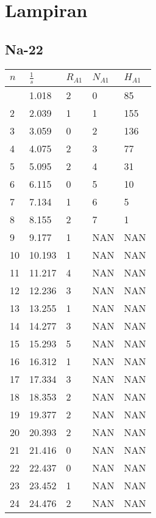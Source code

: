 \documentclass{article}
\begin{document}
	\section*{Lampiran}
		\subsection*{Na-22}
				\begin{longtable}{@{}lllll@{}}
				\toprule
				$n$   & $\frac{1}{s}$     & $R_{A1}$ & $N_{A1}$ & $H_{A1}$ \\* \midrule
				\endfirsthead
				\endhead
				\bottomrule
				\endfoot
				\endlastfoot
				1   & 1.018   & 2     & 0     & 85    \\
				2   & 2.039   & 1     & 1     & 155   \\
				3   & 3.059   & 0     & 2     & 136   \\
				4   & 4.075   & 2     & 3     & 77    \\
				5   & 5.095   & 2     & 4     & 31    \\
				6   & 6.115   & 0     & 5     & 10    \\
				7   & 7.134   & 1     & 6     & 5     \\
				8   & 8.155   & 2     & 7     & 1     \\
				9   & 9.177   & 1     & NAN   & NAN   \\
				10  & 10.193  & 1     & NAN   & NAN   \\
				11  & 11.217  & 4     & NAN   & NAN   \\
				12  & 12.236  & 3     & NAN   & NAN   \\
				13  & 13.255  & 1     & NAN   & NAN   \\
				14  & 14.277  & 3     & NAN   & NAN   \\
				15  & 15.293  & 5     & NAN   & NAN   \\
				16  & 16.312  & 1     & NAN   & NAN   \\
				17  & 17.334  & 3     & NAN   & NAN   \\
				18  & 18.353  & 2     & NAN   & NAN   \\
				19  & 19.377  & 2     & NAN   & NAN   \\
				20  & 20.393  & 2     & NAN   & NAN   \\
				21  & 21.416  & 0     & NAN   & NAN   \\
				22  & 22.437  & 0     & NAN   & NAN   \\
				23  & 23.452  & 1     & NAN   & NAN   \\
				24  & 24.476  & 2     & NAN   & NAN   \\

\end{longtable}
\end{document}

